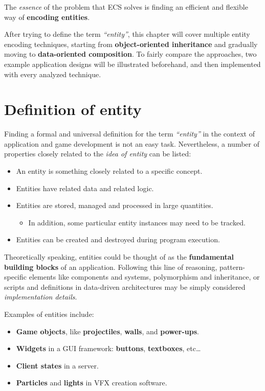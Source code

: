 \documentclass[twoside, 12pt, a4paper, openany]{book}
\providecommand{\tightlist}{%
  \setlength{\itemsep}{0pt}\setlength{\parskip}{0pt}}
\begin{document}
The \emph{essence} of the problem that ECS solves is finding an
efficient and flexible way of \textbf{encoding entities}.

After trying to define the term \emph{``entity''}, this chapter will
cover multiple entity encoding techniques, starting from
\textbf{object-oriented inheritance} and gradually moving to
\textbf{data-oriented composition}. To fairly compare the approaches,
two example application designs will be illustrated beforehand, and then
implemented with every analyzed technique.

\section{Definition of entity}\label{definition-of-entity}

Finding a formal and universal definition for the term \emph{``entity''}
in the context of application and game development is not an easy task.
Nevertheless, a number of properties closely related to the \emph{idea
of entity} can be listed:

\begin{itemize}
\item
  An entity is something closely related to a specific concept.
\item
  Entities have related data and related logic.
\item
  Entities are stored, managed and processed in large quantities.

  \begin{itemize}
  \tightlist
  \item
    In addition, some particular entity instances may need to be
    tracked.
  \end{itemize}
\item
  Entities can be created and destroyed during program execution.
\end{itemize}

Theoretically speaking, entities could be thought of as the
\textbf{fundamental building blocks} of an application. Following this
line of reasoning, pattern-specific elements like components and
systems, polymorphism and inheritance, or scripts and definitions in
data-driven architectures may be simply considered \emph{implementation
details}.

Examples of entities include:

\begin{itemize}
\item
  \textbf{Game objects}, like \textbf{projectiles}, \textbf{walls}, and
  \textbf{power-ups}.
\item
  \textbf{Widgets} in a GUI framework: \textbf{buttons},
  \textbf{textboxes}, etc\ldots{}
\item
  \textbf{Client states} in a server.
\item
  \textbf{Particles} and \textbf{lights} in VFX creation software.
\end{itemize}
\end{document}

